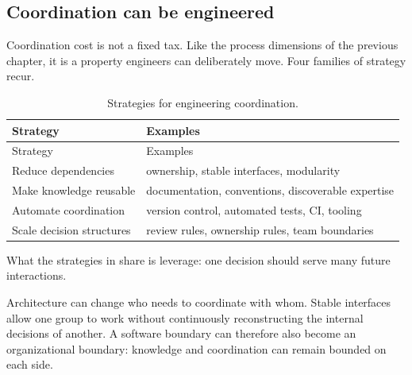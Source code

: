 \subsection{Coordination can be engineered}\label{sec-engineering-coordination}

Coordination cost is not a fixed tax. Like the process dimensions of the previous chapter, it is a
property engineers can deliberately move. Four families of strategy recur.

\begin{longtable}[]{@{}
  >{\raggedright\arraybackslash}p{}
  >{\raggedright\arraybackslash}p{}@{}}
\caption{Strategies for engineering coordination.}\label{tbl-coordination-strategies}\tabularnewline
\toprule\noalign{}
\begin{minipage}[b]{\linewidth}\raggedright
Strategy
\end{minipage} & \begin{minipage}[b]{\linewidth}\raggedright
Examples
\end{minipage} \\
\midrule\noalign{}
\endfirsthead
\toprule\noalign{}
\begin{minipage}[b]{\linewidth}\raggedright
Strategy
\end{minipage} & \begin{minipage}[b]{\linewidth}\raggedright
Examples
\end{minipage} \\
\midrule\noalign{}
\endhead
\bottomrule\noalign{}
\endlastfoot
Reduce dependencies & ownership, stable interfaces, modularity \\
Make knowledge reusable & documentation, conventions, discoverable expertise \\
Automate coordination & version control, automated tests, CI, tooling \\
Scale decision structures & review rules, ownership rules, team boundaries \\
\end{longtable}

What the strategies in \citet{tbl-coordination-strategies} share is leverage: one decision should serve many
future interactions.

Architecture can change who needs to coordinate with whom. Stable interfaces allow one group to work
without continuously reconstructing the internal decisions of another. A software boundary can
therefore also become an organizational boundary: knowledge and coordination can remain bounded on
each side.

